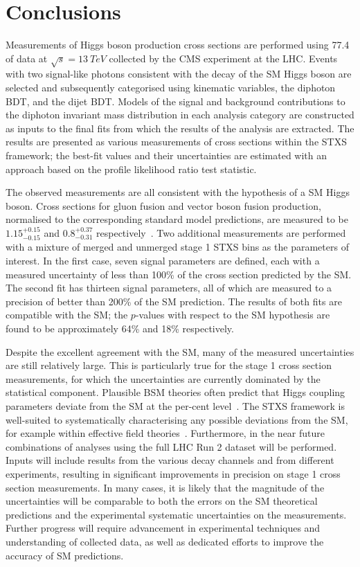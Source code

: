 \chapter{Conclusions}
\label{chap:conclusions}

Measurements of Higgs boson production cross sections are performed using \SI{77.4}{\fbinv} of 
data at $\sqrt{s} = \SI{13}{TeV}$ collected by the CMS experiment at the LHC.
Events with two signal-like photons consistent with the decay of the SM Higgs boson are selected
and subsequently categorised using kinematic variables, the diphoton BDT, and the dijet BDT.
Models of the signal and background contributions to the diphoton invariant mass distribution 
in each analysis category are constructed as inputs to the final fits
from which the results of the analysis are extracted.
The results are presented as various measurements of cross sections within the STXS framework;
the best-fit values and their uncertainties are estimated with an approach 
based on the profile likelihood ratio test statistic.

The observed measurements are all consistent with the hypothesis of a SM Higgs boson.
Cross sections for gluon fusion and vector boson fusion production, 
normalised to the corresponding standard model predictions,
are measured to be $1.15_{-0.15}^{+0.15}$ and $0.8_{-0.31}^{+0.37}$ respectively~\cite{HIG-18-029}.
Two additional measurements are performed with a mixture of merged and unmerged 
stage 1 STXS bins as the parameters of interest.
In the first case, seven signal parameters are defined, 
each with a measured uncertainty of less than 100\% of the cross section predicted by the SM.
The second fit has thirteen signal parameters, all of which are measured to a precision 
of better than 200\% of the SM prediction.
The results of both fits are compatible with the SM; the $p$-values with respect to the SM hypothesis
are found to be approximately 64\% and 18\% respectively.

Despite the excellent agreement with the SM, 
many of the measured uncertainties are still relatively large.
This is particularly true for the stage 1 cross section measurements, 
for which the uncertainties are currently dominated by the statistical component.
Plausible BSM theories often predict that Higgs coupling parameters 
deviate from the SM at the per-cent level~\cite{Snowmass}.
The STXS framework is well-suited to systematically characterising 
any possible deviations from the SM, for example within effective field theories~\cite{STXStoEFT}.
Furthermore, 
in the near future combinations of analyses using the full LHC Run 2 dataset will be performed.
Inputs will include results from the various decay channels and from different experiments, 
resulting in significant improvements in precision on stage 1 cross section measurements.
In many cases, it is likely that the magnitude of the uncertainties will be comparable to both 
the errors on the SM theoretical predictions 
and the experimental systematic uncertainties on the measurements.
Further progress will require advancement in experimental techniques 
and understanding of collected data, 
as well as dedicated efforts to improve the accuracy of SM predictions.

